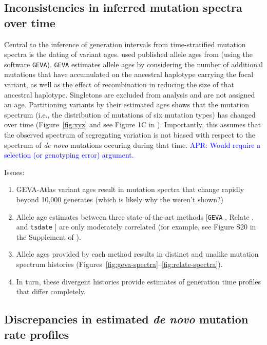 \documentclass[]{article}
\newcommand{\aprcomment}[1]{{\textcolor{blue}{APR: #1}}}
\begin{document}
\subsection*{Inconsistencies in inferred mutation spectra over time}

Central to the inference of generation intervals from time-stratified mutation
spectra is the dating of variant ages. \citet{wang2023human} used published
allele ages from \citet{albers2020dating} (using the software \texttt{GEVA}).
\texttt{GEVA} estimates allele ages by considering the number of additional
mutations that have accumulated on the ancestral haplotype carrying the focal
variant, as well as the effect of recombination in reducing the size of that
ancestral haplotype. Singletons are excluded from analysis and are not assigned
an age. Partitioning variants by their estimated ages shows that the mutation
spectrum (i.e., the distribution of mutations of six mutation types) has
changed over time (Figure~\ref{fig:xyz} and see Figure 1C in
\citeauthor{wang2023human}). Importantly, this assumes that the observed
spectrum of segregating variation is not biased with respect to the spectrum of
\emph{de novo} mutations occuring during that time. \aprcomment{Would require a
selection (or genotyping error) argument.}

Issues:
\begin{enumerate}
    \item GEVA-Atlas variant ages result in mutation spectra that change
        rapidly beyond 10,000 generates (which is likely why the weren't
        shown?)
    \item Allele age estimates between three state-of-the-art methods
        [\texttt{GEVA} \citep{albers2020dating}, Relate
        \citep{speidel2019method}, and \texttt{tsdate}
        \citep{wohns2022unified}] are only moderately correlated
        (for example, see Figure S20 in the Supplement of
        \citet{wohns2022unified}).
    \item Allele ages provided by each method results in distinct and
        unalike mutation spectrum histories
        (Figures~\ref{fig:geva-spectra}--\ref{fig:relate-spectra}).
    \item In turn, these divergent histories provide estimates of
        generation time profiles that differ completely.
\end{enumerate}

\subsection*{Discrepancies in estimated \emph{de novo} mutation rate profiles}
\end{document}
